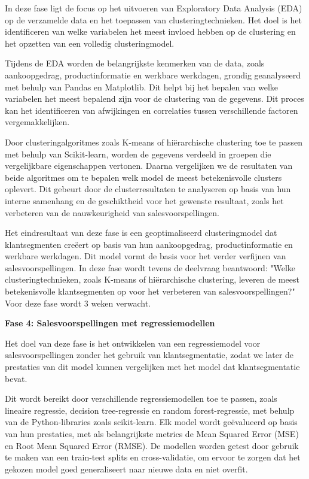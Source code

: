 In deze fase ligt de focus op het uitvoeren van Exploratory Data Analysis (EDA) op de verzamelde data en het toepassen van clusteringtechnieken.  Het doel is het identificeren van welke variabelen het meest invloed hebben op de clustering en het opzetten van een volledig clusteringmodel. 

Tijdens de EDA worden de belangrijkste kenmerken van de data, zoals aankoopgedrag, productinformatie en werkbare werkdagen, grondig geanalyseerd met behulp van Pandas en Matplotlib. Dit helpt bij het bepalen van welke variabelen het meest bepalend zijn voor de clustering van de gegevens. Dit proces kan het identificeren van afwijkingen en correlaties tussen verschillende factoren vergemakkelijken.

Door clusteringalgoritmes zoals K-means of hiërarchische clustering toe te passen met behulp van Scikit-learn, worden de gegevens verdeeld in groepen die vergelijkbare eigenschappen vertonen. Daarna vergelijken we de resultaten van beide algoritmes om te bepalen welk model de meest betekenisvolle clusters oplevert. Dit gebeurt door de clusterresultaten te analyseren op basis van hun interne samenhang en de geschiktheid voor het gewenste resultaat, zoals het verbeteren van de nauwkeurigheid van salesvoorspellingen.

Het eindresultaat van deze fase is een geoptimaliseerd clusteringmodel dat klantsegmenten creëert op basis van hun aankoopgedrag, productinformatie en werkbare werkdagen. Dit model vormt de basis voor het verder verfijnen van salesvoorspellingen. In deze fase wordt tevens de deelvraag beantwoord: "Welke clusteringtechnieken, zoals K-means of hiërarchische clustering, leveren de meest betekenisvolle klantsegmenten op voor het verbeteren van salesvoorspellingen?" Voor deze fase wordt 3 weken verwacht.

\textbf{Fase 4: Salesvoorspellingen met regressiemodellen}

Het doel van deze fase is het ontwikkelen van een regressiemodel voor salesvoorspellingen zonder het gebruik van klantsegmentatie, zodat we later de prestaties van dit model kunnen vergelijken met het model dat klantsegmentatie bevat.

Dit wordt bereikt door verschillende regressiemodellen toe te passen, zoals lineaire regressie, decision tree-regressie en random forest-regressie, met behulp van de Python-libraries zoals scikit-learn. Elk model wordt geëvalueerd op basis van hun prestaties, met als belangrijkste metrics de Mean Squared Error (MSE) en Root Mean Squared Error (RMSE). De modellen worden getest door gebruik te maken van een train-test splits en cross-validatie, om ervoor te zorgen dat het gekozen model goed generaliseert naar nieuwe data en niet overfit. 

